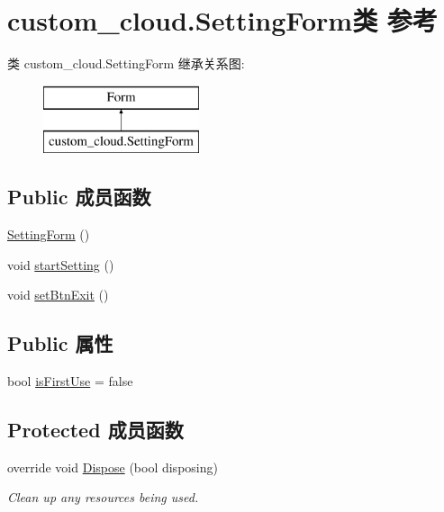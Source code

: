 \hypertarget{classcustom__cloud_1_1_setting_form}{}\section{custom\+\_\+cloud.\+Setting\+Form类 参考}
\label{classcustom__cloud_1_1_setting_form}
类 custom\+\_\+cloud.\+Setting\+Form 继承关系图\+:\begin{figure}[H]
\begin{center}
\leavevmode
\includegraphics[height=2.000000cm]{classcustom__cloud_1_1_setting_form}
\end{center}
\end{figure}
\subsection*{Public 成员函数}
\begin{DoxyCompactItemize}
\item 
\hyperlink{classcustom__cloud_1_1_setting_form_a855e6fc2096d07ae6fff25e9623d0ec5}{Setting\+Form} ()
\item 
void \hyperlink{classcustom__cloud_1_1_setting_form_a3982341175c5ae953d4686f876a7b1f4}{start\+Setting} ()
\item 
void \hyperlink{classcustom__cloud_1_1_setting_form_affe03f43484db3620e97bedf3fa7bcbe}{set\+Btn\+Exit} ()
\end{DoxyCompactItemize}
\subsection*{Public 属性}
\begin{DoxyCompactItemize}
\item 
bool \hyperlink{classcustom__cloud_1_1_setting_form_ad257275870a0ac1928568f968e06eb93}{is\+First\+Use} = false
\end{DoxyCompactItemize}
\subsection*{Protected 成员函数}
\begin{DoxyCompactItemize}
\item 
override void \hyperlink{classcustom__cloud_1_1_setting_form_a1fd392ef4a493678017d5a2f83db315f}{Dispose} (bool disposing)
\begin{DoxyCompactList}\small\item\em Clean up any resources being used. \end{DoxyCompactList}\end{DoxyCompactItemize}
